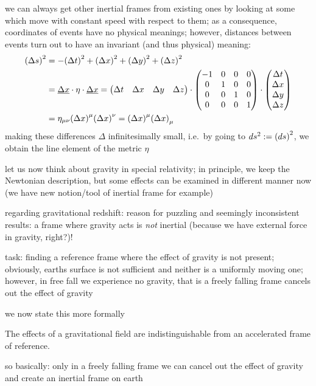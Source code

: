 we can always get other inertial frames from existing ones by looking at some which move with constant speed with respect to them; as a consequence, coordinates of events have no physical meanings; however, distances between events turn out to have an invariant (and thus physical) meaning:
\begin{align*}
\qty(\Delta s)^2 &= - \qty(\Delta t)^2 + \qty(\Delta x)^2 + \qty(\Delta y)^2 + \qty(\Delta z)^2
\\
&= \underline{\Delta x} \cdot \eta \cdot \underline{\Delta x} = \mqty(\Delta t & \Delta x & \Delta y & \Delta z) \cdot \mqty(-1 & 0 & 0 & 0 \\ 0 & 1 & 0 & 0 \\ 0 & 0 & 1 & 0 \\ 0 & 0 & 0 & 1) \cdot \mqty(\Delta t \\ \Delta x \\ \Delta y \\ \Delta z)
\\
&= \eta_{\mu \nu} \qty(\Delta x)^\mu \qty(\Delta x)^\nu = \qty(\Delta x)^\mu \qty(\Delta x)_\mu
\end{align*}
making these differences $\Delta$ infinitesimally small, i.e.~by going to $ds^2 := \qty(ds)^2$, we obtain the line element of the metric $\eta$



let us now think about gravity in special relativity; in principle, we keep the Newtonian description, but some effects can be examined in different manner now (we have new notion/tool of inertial frame for example)

regarding gravitational redshift: reason for puzzling and seemingly inconsistent results: a frame where gravity acts is \emph{not} inertial (because we have external force in gravity, right?)!

task: finding a reference frame where the effect of gravity is not present; obviously, earths surface is not sufficient and neither is a uniformly moving one; however, in free fall we experience no gravity, that is a freely falling frame cancels out the effect of gravity

we now state this more formally

\begin{prop}
The effects of a gravitational field are indistinguishable from an accelerated frame of reference.
\end{prop}
so basically: only in a freely falling frame we can cancel out the effect of gravity and create an inertial frame on earth


